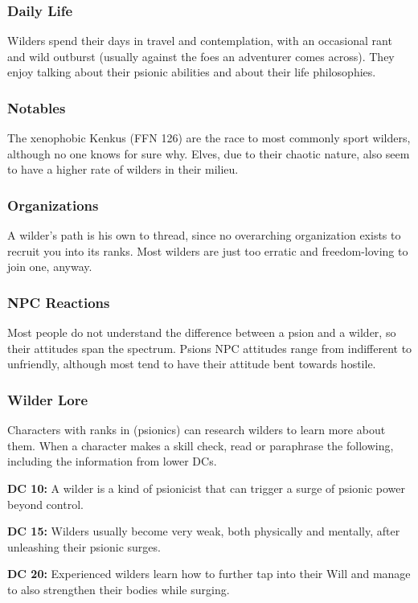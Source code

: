 \subsubsection{Daily Life}

Wilders spend their days in travel and contemplation, with an occasional rant and wild outburst (usually against the foes an adventurer comes across). They enjoy talking about their psionic abilities and about their life philosophies.

\subsubsection{Notables}

The xenophobic Kenkus (FFN 126) are the race to most commonly sport wilders, although no one knows for sure why. Elves, due to their chaotic nature, also seem to have a higher rate of wilders in their milieu.

\subsubsection{Organizations}

A wilder's path is his own to thread, since no overarching organization exists to recruit you into its ranks. Most wilders are just too erratic and freedom-loving to join one, anyway.

\subsubsection{NPC Reactions}

Most people do not understand the difference between a psion and a wilder, so their attitudes span the spectrum. Psions NPC attitudes range from indifferent to unfriendly, although most  tend to have their attitude bent towards hostile.

\subsubsection{Wilder Lore}

Characters with ranks in  (psionics) can research wilders to learn more about them. When a character makes a skill check, read or paraphrase the following, including the information from lower DCs.

\textbf{DC 10:} A wilder is a kind of psionicist that can trigger a surge of psionic power beyond control.

\textbf{DC 15:} Wilders usually become very weak, both physically and mentally, after unleashing their psionic surges.

\textbf{DC 20:} Experienced wilders learn how to further tap into their Will and manage to also strengthen their bodies while surging.